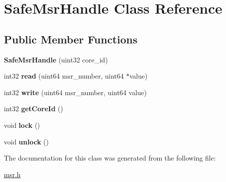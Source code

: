 \hypertarget{class_safe_msr_handle}{}\section{Safe\+Msr\+Handle Class Reference}
\label{class_safe_msr_handle}
\subsection*{Public Member Functions}
\begin{DoxyCompactItemize}
\item 
\mbox{\label{class_safe_msr_handle_af7a62cd143e86be1ef2d2f6d5f67fc30}} 
{\bfseries Safe\+Msr\+Handle} (uint32 core\+\_\+id)
\item 
\mbox{\label{class_safe_msr_handle_af2ad27203ae5d1072ad8e1ca5d988ce5}} 
int32 {\bfseries read} (uint64 msr\+\_\+number, uint64 $\ast$value)
\item 
\mbox{\label{class_safe_msr_handle_a252aa9dee867d8b8f787b1de007b49a7}} 
int32 {\bfseries write} (uint64 msr\+\_\+number, uint64 value)
\item 
\mbox{\label{class_safe_msr_handle_ae8735531f00abaaa17aac519c1e5360e}} 
int32 {\bfseries get\+Core\+Id} ()
\item 
\mbox{\label{class_safe_msr_handle_a89f1431cde1d9e8ccd12c73cf6646cfd}} 
void {\bfseries lock} ()
\item 
\mbox{\label{class_safe_msr_handle_af88c3d09575dab20ab68ce0267477e31}} 
void {\bfseries unlock} ()
\end{DoxyCompactItemize}


The documentation for this class was generated from the following file\+:\begin{DoxyCompactItemize}
\item 
\mbox{\hyperlink{msr_8h}{msr.\+h}}\end{DoxyCompactItemize}
